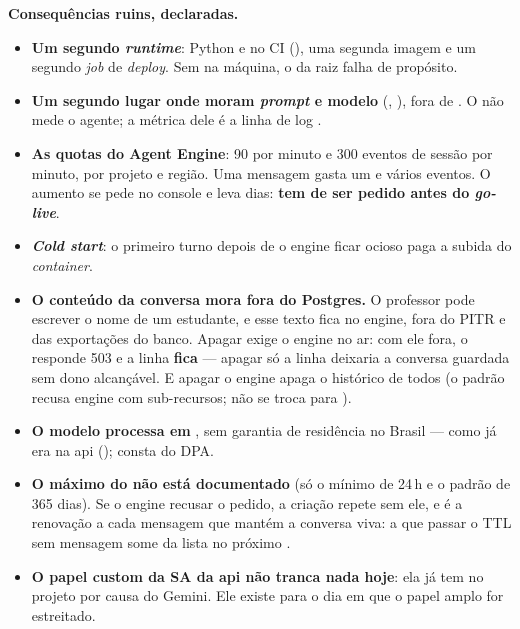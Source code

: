 \textbf{Consequências ruins, declaradas.}

\begin{itemize}
  \item \textbf{Um segundo \emph{runtime}}: Python e  no CI
    (), uma segunda imagem e um segundo \emph{job} de
    \emph{deploy}. Sem  na máquina, o  da raiz falha de
    propósito.
  \item \textbf{Um segundo lugar onde moram \emph{prompt} e modelo}
    (, ), fora de . O
     não mede o agente; a métrica dele é a linha de log
    .
  \item \textbf{As quotas do Agent Engine}: 90  por minuto e 300
    eventos de sessão por minuto, por projeto e região. Uma mensagem gasta um
     e vários eventos. O aumento se pede no console e leva dias:
    \textbf{tem de ser pedido antes do \emph{go-live}}.
  \item \textbf{\emph{Cold start}}: o primeiro turno depois de o engine ficar
    ocioso paga a subida do \emph{container}.
  \item \textbf{O conteúdo da conversa mora fora do Postgres.} O professor pode
    escrever o nome de um estudante, e esse texto fica no engine, fora do PITR e
    das exportações do banco. Apagar exige o engine no ar: com ele fora, o
     responde 503 e a linha \textbf{fica} --- apagar só a linha
    deixaria a conversa guardada sem dono alcançável. E apagar o engine apaga o
    histórico de todos (o  padrão recusa engine com
    sub-recursos; não se troca para ).
  \item \textbf{O modelo processa em }, sem garantia de residência no
    Brasil --- como já era na api (); consta do DPA.
  \item \textbf{O máximo do  não está documentado} (só o mínimo
    de 24\,h e o padrão de 365 dias). Se o engine recusar o pedido, a criação
    repete sem ele, e é a renovação a cada mensagem que mantém a conversa viva:
    a que passar o TTL sem mensagem some da lista no próximo .
  \item \textbf{O papel custom da SA da api não tranca nada hoje}: ela já tem
     no projeto por causa do Gemini. Ele existe para o
    dia em que o papel amplo for estreitado.
\end{itemize}

